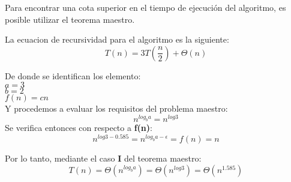     Para encontrar una cota superior en el tiempo de ejecución del algoritmo, es posible utilizar el teorema maestro.
    
    La ecuacion de recursividad para el algoritmo es la siguiente:
    \begin{equation*}
        T(n)=3T\left(\frac{n}{2}\right)+\Theta(n)
    \end{equation*}
    
    \hfill \break
    
    De donde se identifican los elemento:\\
    $a=3$\\
    $b=2$\\
    $f(n)=cn$\\
    Y procedemos a evaluar los requisitos del problema maestro:
            \begin{equation*}
                n^{log_ba}=n^{log3}
            \end{equation*}
            Se verifica entonces con respecto a \textbf{f(n)}:
            \begin{equation*}
                n^{log3-0.585}=n^{log_ba-\epsilon}=f(n)=n
            \end{equation*}
            
            Por lo tanto, mediante el caso \textbf{I} del teorema maestro:
            \begin{equation*}
                T(n) = \Theta (n^{log_ba}) = \Theta(n^{log3}) = \Theta(n^{1.585} )
            \end{equation*}
            
    \newpage